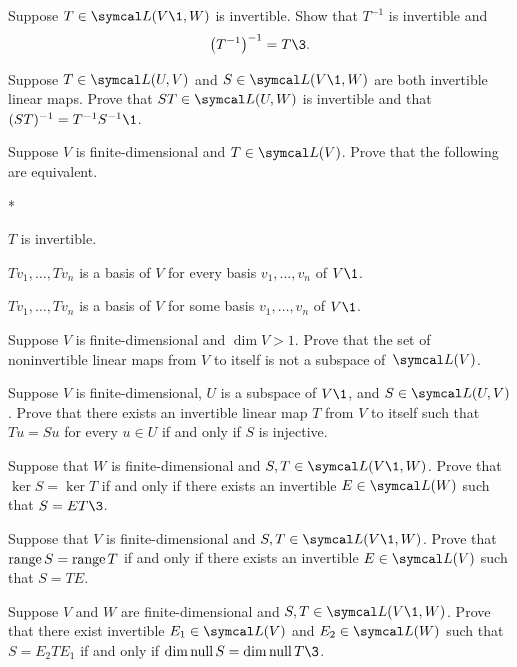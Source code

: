 \begin{exercises}

\exercise
Suppose $T \in \L(V\1, W)$ is invertible. Show that $T^{-1}$ is invertible and
\[
\paren[\big]{ T^{-1} }^{-1} = T\3.
\]
\exercisedisplayend


\exercise
Suppose $T \in \L(U, V)$ and $S \in \L(V\1,W)$ are both invertible linear maps. Prove that $ST \in \L(U, W)$ is invertible and that $(ST)^{-1} = T^{-1} S^{-1}\1$.


\exercise
Suppose $V$ is finite-dimensional and $T \in \L(V)$. Prove that the following are equivalent.
\begin{subtheorem}*
\item
$T$ is invertible.
\item
$Tv_1, \ldots, Tv_n$ is a basis of $V$ for every basis $v_1, \ldots, v_n$ of $V\1$.
\item
$Tv_1, \ldots, Tv_n$ is a basis of $V$ for some basis $v_1, \ldots, v_n$ of $V\1$.
\end{subtheorem}
\exercisesubtheoremend


\exercise
Suppose $V$ is finite-dimensional and $\dim V > 1$. Prove that the set of
noninvertible linear maps from $V$ to itself is  not a subspace of~$\L(V)$.


\exercise
Suppose $V$ is finite-dimensional, $U$ is a subspace of $V\1$, and $S \in \L(U, V)$. Prove that there exists an invertible linear map $T$ from $V$ to itself such that $Tu = Su$ for every $u \in U$ if and only if $S$ is injective.\label{3inv}


\exercise
Suppose that $W$ is finite-dimensional and $S, T \in \L(V\1, W)$. Prove that
$
\ker S = \ker T$
if and only if there exists an invertible \mbox{$E \in \L(W)$} such that $S = ET\3$. \label{1020}


\exercise
Suppose that $V$ is finite-dimensional and $S, T \in \L(V\1, W)$. Prove that
$
\operatorname{range} S = \operatorname{range} T
$
if and only if there exists an invertible $E \in \L(V)$ such that $S = T E$.


\exercise
Suppose $V$ and $W$ are finite-dimensional and $S, T\in \L(V\1, W)$. Prove that there exist invertible
$E_1 \in \L(V)$ and $E_2\in \L(W)$ such that $S = E_2 T E_1$ if and only if $\dim \ker S = \dim \ker T\3$.

\end{exercises}
